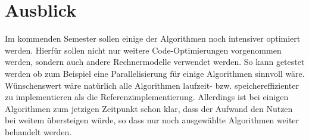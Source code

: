 \section{Ausblick}

Im  kommenden Semester sollen einige der Algorithmen noch intensiver optimiert werden. Hierfür sollen nicht nur weitere Code-Optimierungen vorgenommen werden, sondern auch andere Rechnermodelle verwendet werden. So kann getestet werden ob zum Beispiel eine Parallelisierung für einige Algorithmen sinnvoll wäre.\\
Wünschenswert wäre natürlich alle Algorithmen laufzeit- bzw. speichereffizienter zu implementieren als die Referenzimplementierung. Allerdings ist bei einigen Algorithmen zum jetzigen Zeitpunkt schon klar, dass der Aufwand den Nutzen bei weitem übersteigen würde, so dass nur noch ausgewählte Algorithmen weiter behandelt werden.